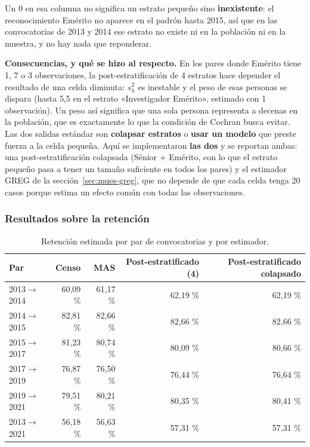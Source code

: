 Un 0 en esa columna no significa un estrato pequeño sino \textbf{inexistente}: el
reconocimiento Emérito no aparece en el padrón hasta 2015, así que en las
convocatorias de 2013 y 2014 ese estrato no existe ni en la población ni en la
muestra, y no hay nada que reponderar.

\textbf{Consecuencias, y qué se hizo al respecto.} En los pares donde Emérito
tiene 1, 7 o 3 observaciones, la post-estratificación de 4 estratos hace
depender el resultado de una celda diminuta: $s_h^2$ es inestable y el peso de
esas personas se dispara (hasta 5,5 en el estrato «Investigador Emérito»,
estimado con 1 observación). Un peso así significa que una sola persona
representa a decenas en la población, que es exactamente lo que la condición de
Cochran busca evitar. Las dos salidas estándar son \textbf{colapsar estratos} o
\textbf{usar un modelo} que preste fuerza a la celda pequeña. Aquí se
implementaron \textbf{las dos} y se reportan ambas: una post-estratificación
colapsada (Sénior + Emérito, con lo que el estrato pequeño pasa a tener un
tamaño suficiente en todos los pares) y el estimador GREG de la
sección~\ref{sec:mues-greg}, que no depende de que cada celda tenga 20 casos
porque estima un efecto común con todas las observaciones.

\subsubsection{Resultados sobre la retención}

\begin{table}[H]
  \centering
  \small
  \caption{Retención estimada por par de convocatorias y por estimador.}
  \label{tab:mues-retencion}
  \begin{tabular}{@{}lrrrr@{}}
    \toprule
    \textbf{Par} & \textbf{Censo} & \textbf{MAS} & \textbf{Post-estratificado (4)}
      & \textbf{Post-estratificado colapsado} \\
    \midrule
    2013$\rightarrow$2014 & 60,09 \% & 61,17 \% & 62,19 \% & 62,19 \% \\
    2014$\rightarrow$2015 & 82,81 \% & 82,66 \% & 82,66 \% & 82,66 \% \\
    2015$\rightarrow$2017 & 81,23 \% & 80,74 \% & 80,09 \% & 80,66 \% \\
    2017$\rightarrow$2019 & 76,87 \% & 76,50 \% & 76,44 \% & 76,64 \% \\
    2019$\rightarrow$2021 & 79,51 \% & 80,21 \% & 80,35 \% & 80,41 \% \\
    2013$\rightarrow$2021 & 56,18 \% & 56,63 \% & 57,31 \% & 57,31 \% \\
    \bottomrule
  \end{tabular}
\end{table}

